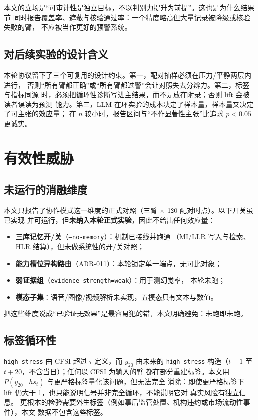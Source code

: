 \documentclass[UTF8,fontset=fandol,11pt,a4paper]{ctexart}
\begin{document}
本文的立场是“可审计性是独立目标，不以判别力提升为前提”。这也是为什么结果节
同时报告覆盖率、遮蔽与核验通过率：一个精度略高但大量记录被降级或核验失败的臂，
不应被当作更好的预警系统。

\subsection{对后续实验的设计含义}

本轮协议留下了三个可复用的设计约束。第一，配对抽样必须在压力/平静两层内进行，
否则“所有臂都正确”或“所有臂都过警”会让对照失去分辨力。第二，标签与指标同源
时，必须把循环性诊断写进主结果，而不是放在附录；否则 lift 会被读者误读为预测
能力。第三，LLM 在环实验的成本决定了样本量，样本量又决定了可主张的效应量；
在 $n$ 较小时，报告区间与“不作显著性主张”比追求 $p<0.05$ 更诚实。

\section{有效性威胁}
\label{sec:threats}

\subsection{未运行的消融维度}

本文只报告了协作模式这一维度的正式对照（三臂 × 120 配对时点）。以下开关虽已实现
并可运行，但\textbf{未纳入本轮正式实验}，因此不给出任何效应量：

\begin{itemize}
  \item \textbf{三库记忆开/关}（\texttt{--no-memory}）：机制已接线并跑通
        （MI/LLR 写入与检索、HLR 结算），但未做系统性的开/关对照；
  \item \textbf{能力槽位异构路由}（ADR-011）：本轮锁定单一端点，无可比对象；
  \item \textbf{弱证据组}（\texttt{evidence\_strength=weak}）：用于测幻觉率，
        本轮未跑；
  \item \textbf{模态子集}：语音/图像/视频解析未实现，五模态只有文本与数值。
\end{itemize}

把这些维度说成“已验证无效果”是最容易犯的错，本文明确避免：未跑即未跑。

\subsection{标签循环性}

\texttt{high\_stress} 由 CFSI 超过 $\tau$ 定义，而 $y_{20}$ 由未来的
\texttt{high\_stress} 构造（$t+1$ 至 $t+20$，不含当日）；任何以 CFSI 为输入的臂
都在部分重建标签。本文用 $P(y_{20}\mid hs_t)$ 与更严格标签量化该问题，但无法完全
消除：即使更严格标签下 lift 仍大于 1，也只能说明信号并非完全循环，不能说明它对
真实风险有独立信息。
更根本的检验需要外生标签（例如事后监管处置、机构违约或市场流动性事件），本文
数据不包含这些标签。
\end{document}
